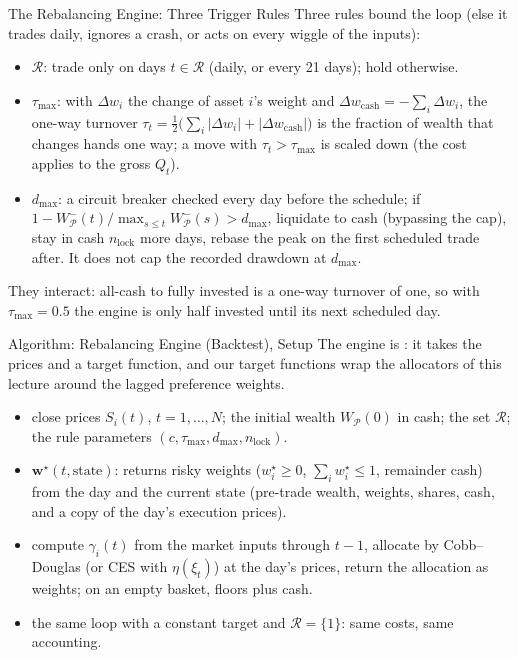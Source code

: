 \documentclass[aspectratio=169,11pt]{beamer}
\newcommand{\bw}{\mathbf{w}}
\newcommand{\Rset}{\mathcal{R}}
\newcommand{\WP}{W_{\mathcal{P}}}
\begin{document}
\begin{frame}{The Rebalancing Engine: Three Trigger Rules}
  Three rules bound the loop (else it trades daily, ignores a crash, or acts on
  every wiggle of the inputs):
  \begin{itemize}\setlength{\itemsep}{0.25em}
    \item {} $\Rset$: trade only on days $t\in\Rset$
      (daily, or every 21 days); hold otherwise.
    \item {} $\tau_{\max}$: with $\Delta w_i$ the change of
      asset $i$'s weight and $\Delta w_{\mathrm{cash}}=-\sum_i\Delta w_i$, the
      one-way turnover $\tau_t=\tfrac12\bigl(\sum_i|\Delta w_i|+|\Delta w_{\mathrm{cash}}|\bigr)$
      is the fraction of wealth that changes hands one way; a move with
      $\tau_t>\tau_{\max}$ is scaled down (the cost applies to the gross $Q_t$).
    \item {} $d_{\max}$: a circuit breaker checked every day
      before the schedule; if $1-W^-_{\mathcal P}(t)/\max_{s\le t}W^-_{\mathcal P}(s)>d_{\max}$,
      liquidate to cash (bypassing the cap), stay in cash $n_{\mathrm{lock}}$ more
      days, rebase the peak on the first scheduled trade after. It does not cap the
      recorded drawdown at $d_{\max}$.
  \end{itemize}
  They interact: all-cash to fully invested is a one-way turnover of one, so with
  $\tau_{\max}=0.5$ the engine is only half invested until its next scheduled day.
\end{frame}

\begin{frame}{Algorithm: Rebalancing Engine (Backtest), Setup}
  The engine is : it takes the prices and a target
  function, and our target functions wrap the allocators of this lecture around
  the lagged preference weights.
  \begin{itemize}\setlength{\itemsep}{0.45em}
    \item \textbf{} close prices $S_i(t)$, $t=1,\ldots,N$; the initial
      wealth $\WP(0)$ in cash; the set $\Rset$; the rule parameters
      $(c,\tau_{\max},d_{\max},n_{\mathrm{lock}})$.
    \item \textbf{} $\bw^\star(t,\mathrm{state})$: returns
      risky weights ($w_i^\star\ge0$, $\sum_iw_i^\star\le1$, remainder cash) from
      the day and the current state (pre-trade wealth, weights, shares, cash, and a
      copy of the day's execution prices).
    \item \textbf{} compute $\gamma_i(t)$ from the market inputs through
      $t-1$, allocate by Cobb--Douglas (or CES with $\eta(\xi_t)$) at the day's
      prices, return the allocation as weights; on an empty basket, floors plus cash.
    \item \textbf{} the same loop with a constant target and
      $\Rset=\{1\}$: same costs, same accounting.
  \end{itemize}
\end{frame}
\end{document}
